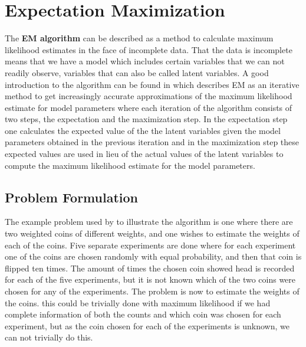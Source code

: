 
\section{Expectation Maximization}
\label{section:em}

The \textbf{EM algorithm} \citep{dempster1977maximum} can be described as a method to calculate maximum likelihood estimates in the face of incomplete data. That the data is incomplete means that we have a model which includes certain variables that we can not readily observe, variables that can also be called latent variables. 
A good introduction to the algorithm can be found in \citet{do2008expectation} which describes EM as an iterative method to get increasingly accurate approximations of the maximum likelihood estimate for model parameters where each iteration of the algorithm consists of two steps, the expectation and the maximization step. In the expectation step one calculates the expected value of the the latent variables given the model parameters obtained in the previous iteration and in the maximization step these expected values are used in lieu of the actual values of the latent variables to compute the maximum likelihood estimate for the model parameters.


\subsection{Problem Formulation}
The example problem used by \citet{do2008expectation} to illustrate the algorithm is one where there are two weighted coins of different weights, and one wishes to estimate the weights of each of the coins. Five separate experiments are done where for each experiment one of the coins are chosen randomly with equal probability, and then that coin is flipped ten times. The amount of times the chosen coin showed head is recorded for each of the five experiments, but it is not known which of the two coins were chosen for any of the experiments. The problem is now to estimate the weights of the coins. this could be trivially done with maximum likelihood if we had complete information of both the counts and which coin was chosen for each experiment, but as the coin chosen for each of the experiments is unknown, we can not trivially do this.

